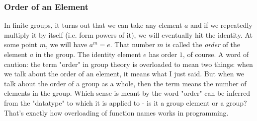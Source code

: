 










\subsubsection{Order of an Element}
In finite groups, it turns out that we can take any element $a$ and if we repeatedly multiply it by itself (i.e. form powers of it), we will eventually hit the identity. At some point $m$, we will have $a^m = e$. That number $m$ is called the \emph{order} of the element $a$ in the group. The identity element $e$ has order $1$, of course. A word of caution: the term "order" in group theory is overloaded to mean two things: when we talk about the order of an element, it means what I just said. But when we talk about the order of a group as a whole, then the term means the number of elements in the group. Which sense is meant by the word "order" can be inferred from the "datatype" to which it is applied to - is it a group element or a group? That's exactly how overloading of function names works in programming. 


